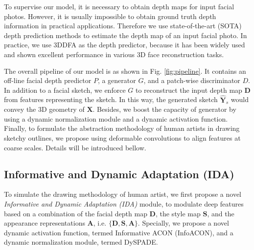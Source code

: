 \documentclass[10pt,twocolumn,letterpaper]{article}
\begin{document}
To supervise our model, it is necessary to obtain depth maps for input facial photos. However, it is usually impossible to obtain ground truth depth information in practical applications. 
Therefore we use state-of-the-art (SOTA) depth prediction methods to estimate the depth map of an input facial photo. In practice, we use 3DDFA \cite{3DDFA} as the depth predictor, because it has been widely used and shown excellent performance in various 3D face reconstruction tasks. 

The overall pipeline of our model is as shown in Fig. \ref{fig:pipeline}. It contains an off-line facial depth predictor $P$, a generator $G$, and a patch-wise discriminator $D$. 
In addition to a facial sketch, we enforce $G$ to reconstruct the input depth map $\mathbf{D}$ from features representing the sketch. In this way, the generated sketch $\hat{\mathbf{Y}}_s$ would convey the 3D geometry of $\mathbf{X}$. 
Besides, we boost the capacity of generator by using a dynamic normalization module and a  dynamic activation function. 
Finally, to formulate the abstraction methodology of human artists in drawing sketchy outlines, we propose using deformable convolutions to align features at coarse scales. Details will be introduced bellow. 


\subsection{Informative and Dynamic Adaptation (IDA)}
\label{ssec:IDA}

To simulate the drawing methodology of human artist, we first propose a novel \emph{Informative and Dynamic Adaptation (IDA)} module, to modulate deep features based on a combination of the facial depth map $\mathbf{D}$, the style map $\mathbf{S}$, and the appearance representations $\mathbf{A}$, i.e. $\{ \mathbf{D}, \mathbf{S}, \mathbf{A} \}$. Specially, we propose a novel dynamic activation function, termed Informative ACON (InfoACON), and a dynamic normalization module, termed DySPADE. 
\end{document}
